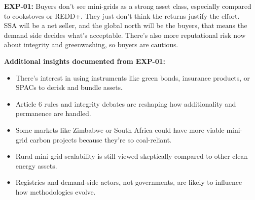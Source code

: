 \textbf{EXP-01:} Buyers don't see mini-grids as a strong asset class, especially compared to cookstoves or REDD+. They just don't think the returns justify the effort. SSA will be a net seller, and the global north will be the buyers, that means the demand side decides what's acceptable. There's also more reputational risk now about integrity and greenwashing, so buyers are cautious.

\textbf{Additional insights documented from EXP-01:}
\begin{itemize}
	\item There's interest in using instruments like green bonds, insurance products, or SPACs to derisk and bundle assets.
	\item Article 6 rules and integrity debates are reshaping how additionality and permanence are handled.
	\item Some markets like Zimbabwe or South Africa could have more viable mini-grid carbon projects because they're so coal-reliant.
	\item Rural mini-grid scalability is still viewed skeptically compared to other clean energy assets.
	\item Registries and demand-side actors, not governments, are likely to influence how methodologies evolve.
\end{itemize}